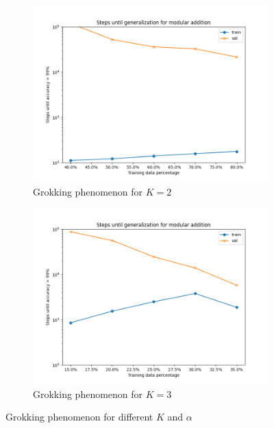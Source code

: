 \begin{figure}[!ht]
	\centering
	\begin{subfigure}{0.45\textwidth}
		\centering
		\includegraphics[width=\linewidth]{fig/Transformer_p=31/K=2/Transformer_alpha.png}
		\caption{Grokking phenomenon for $K=2$}
		\label{fig:grok_of_K=2}
	\end{subfigure}
	\begin{subfigure}{0.45\textwidth}
		\centering
		\includegraphics[width=\linewidth]{fig/Transformer_p=31/K=3/Transformer_alpha.png}
		\caption{Grokking phenomenon for $K=3$}
		\label{fig:grok_of_K=3}
	\end{subfigure}
	
	\caption{Grokking phenomenon for different $K$ and $\alpha$}
	\label{fig:grok_of_K=2_3}
\end{figure}
 
